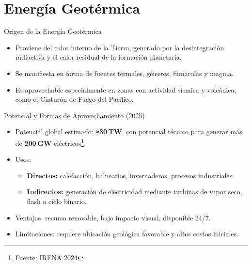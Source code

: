 \documentclass[main.tex]{subfiles}
\begin{document}
\section{Energía Geotérmica}

\begin{frame}{Origen de la Energía Geotérmica}
    \begin{itemize}
        \item Proviene del calor interno de la Tierra, generado por la desintegración radiactiva y el calor residual de la formación planetaria.
        \item Se manifiesta en forma de fuentes termales, géiseres, fumarolas y magma.
        \item Es aprovechable especialmente en zonas con actividad sísmica y volcánica, como el Cinturón de Fuego del Pacífico.
    \end{itemize}
\end{frame}

\begin{frame}{Potencial y Formas de Aprovechamiento (2025)}
    \begin{itemize}
        \item Potencial global estimado: \textbf{≈30 TW}, con potencial técnico para generar más de \textbf{200 GW} eléctricos\footnote{Fuente: IRENA 2024}.
        \item Usos:
        \begin{itemize}
            \item \textbf{Directos:} calefacción, balnearios, invernaderos, procesos industriales.
            \item \textbf{Indirectos:} generación de electricidad mediante turbinas de vapor seco, flash o ciclo binario.
        \end{itemize}
        \item Ventajas: recurso renovable, bajo impacto visual, disponible 24/7.
        \item Limitaciones: requiere ubicación geológica favorable y altos costos iniciales.
    \end{itemize}
\end{frame}
\end{document}
